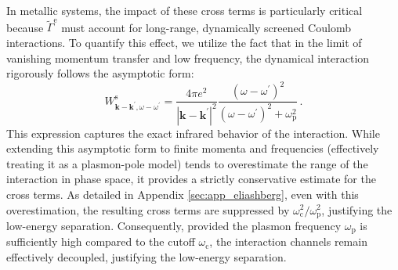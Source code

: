 \documentclass[%
 reprint,
superscriptaddress,
 amsmath,amssymb,
 aps,
prx,
]{revtex4-2}
\begin{document}
In metallic systems, the impact of these cross terms is particularly critical because $\tilde{\Gamma}^{\text{e}}$ must account for long-range, dynamically screened Coulomb interactions.  To quantify this effect, we utilize the fact that in the limit of vanishing momentum transfer and low frequency, the dynamical interaction rigorously follows the asymptotic form:
\begin{equation}
W_{\mathbf{k}-\mathbf{k}^{\prime}, \omega-\omega^{\prime}}^{\mathrm{s}}=\frac{4 \pi e^2}{\left|\mathbf{k}-\mathbf{k}^{\prime}\right|^2} \frac{\left(\omega-\omega^{\prime}\right)^2}{\left(\omega-\omega^{\prime}\right)^2+\omega_{\text{p}}^2}\, .
\end{equation}
This expression captures the exact infrared behavior of the interaction. While extending this asymptotic form to finite momenta and frequencies (effectively treating it as a plasmon-pole model) tends to overestimate the range of the interaction in phase space, it provides a strictly conservative estimate for the cross terms. As detailed in Appendix \ref{sec:app_eliashberg}, even with this overestimation, the resulting cross terms are suppressed by $\omega_{\text{c}}^2/\omega_{\text{p}}^2$, justifying the low-energy separation. Consequently, provided the plasmon frequency $\omega_{\text{p}}$ is sufficiently high compared to the cutoff $\omega_{\text{c}}$, the interaction channels remain effectively decoupled, justifying the low-energy separation.
\end{document}
